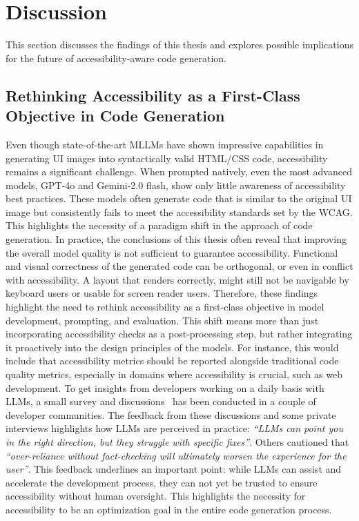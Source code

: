 \chapter{Discussion}\label{chapter:discussion}
This section discusses the findings of this thesis 
and explores possible implications for the future 
of accessibility-aware code generation.

\section{Rethinking Accessibility as a First-Class Objective in Code Generation}
Even though state-of-the-art MLLMs have shown impressive 
capabilities in generating UI images into syntactically 
valid HTML/CSS code, accessibility remains a significant 
challenge. When prompted natively, even the most advanced models, 
GPT-4o and Gemini-2.0 flash, show only little awareness 
of accessibility best practices.
These models often generate code that is similar to the 
original UI image but consistently fails to meet 
the accessibility standards set by the WCAG.
This highlights the necessity of a paradigm 
shift in the approach of code generation. 
In practice, the conclusions of this thesis 
often reveal that improving 
the overall model quality is not sufficient to guarantee
accessibility. 
Functional and visual correctness of the generated code 
can be orthogonal, or even in conflict with accessibility. 
A layout that renders correctly, might still not be navigable 
by keyboard users or usable for screen reader users.\newline 
Therefore, these findings highlight the need to rethink 
accessibility as a first-class objective in model
development, prompting, and evaluation. This shift 
means more than just incorporating accessibility 
checks as a post-processing step, but rather
integrating it proactively into the design principles 
of the models. For instance, this would include that 
accessibility metrics should be reported alongside traditional 
code quality metrics, especially in domains 
where accessibility is crucial, such as web development.\newline 
To get insights from developers working on 
a daily basis with LLMs, a small survey and discussions~\cite{feng2025ux, lutz2025mot} 
has been conducted in a couple of developer communities.
The feedback from these discussions and some private interviews 
highlights how 
LLMs are perceived in practice: \textit{``LLMs can point 
you in the right direction, but they struggle with specific fixes''}.
Others cautioned that \textit{``over-reliance without fact-checking will 
ultimately worsen the experience for the user''}. This 
feedback underlines an important point: while LLMs can 
assist and accelerate the development process, they can not yet
be trusted to ensure accessibility without human oversight. 
This highlights the necessity for accessibility to be 
an optimization goal in the entire code generation process.

